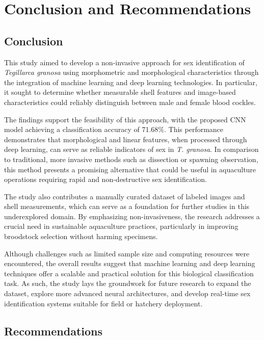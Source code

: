 \chapter{Conclusion and Recommendations}

\section{Conclusion}

This study aimed to develop a non-invasive approach for sex identification of \textit{Tegillarca granosa} using morphometric and morphological characteristics through the integration of machine learning and deep learning technologies. In particular, it sought to determine whether measurable shell features and image-based characteristics could reliably distinguish between male and female blood cockles.

The findings support the feasibility of this approach, with the proposed CNN model achieving a classification accuracy of 71.68\%. This performance demonstrates that morphological and linear features, when processed through deep learning, can serve as reliable indicators of sex in \textit{T. granosa}. In comparison to traditional, more invasive methods such as dissection or spawning observation, this method presents a promising alternative that could be useful in aquaculture operations requiring rapid and non-destructive sex identification.

The study also contributes a manually curated dataset of labeled images and shell measurements, which can serve as a foundation for further studies in this underexplored domain. By emphasizing non-invasiveness, the research addresses a crucial need in sustainable aquaculture practices, particularly in improving broodstock selection without harming specimens.

Although challenges such as limited sample size and computing resources were encountered, the overall results suggest that machine learning and deep learning techniques offer a scalable and practical solution for this biological classification task. As such, the study lays the groundwork for future research to expand the dataset, explore more advanced neural architectures, and develop real-time sex identification systems suitable for field or hatchery deployment.

\section{Recommendations}


